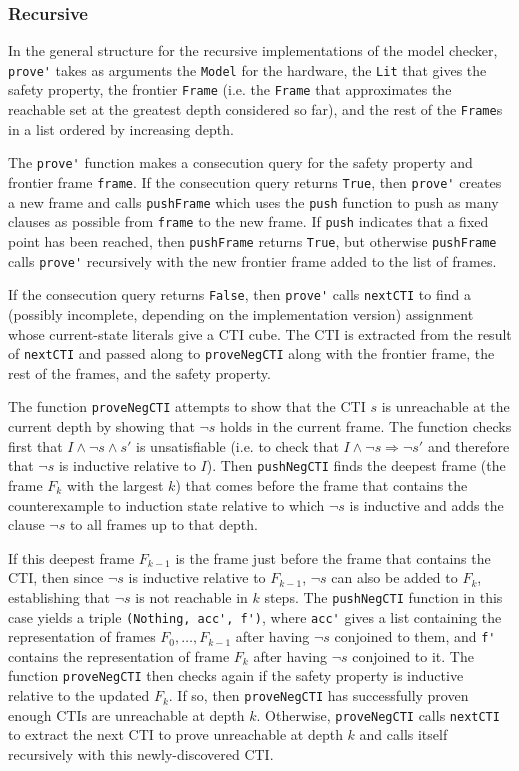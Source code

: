 \documentclass[12pt,a4paper,twoside,openright]{report}
\begin{document}
\subsubsection{Recursive}
In the general structure for the recursive implementations of the model checker,
\verb,prove', takes as arguments the \verb,Model, for the hardware, the
\verb,Lit, that gives the safety property, the frontier \verb,Frame, 
(i.e. the \verb,Frame, that approximates the reachable set at the greatest
depth considered so far), and the rest of the \verb,Frame,s in a list ordered by
increasing depth.

The \verb,prove', function makes a consecution query for the safety property and frontier
frame \verb,frame,. If the consecution query returns \verb,True,, then \verb,prove',
creates a new frame and calls \verb,pushFrame, which uses the \verb,push, function to
push as many clauses as possible from \verb,frame, to the new frame. If \verb,push,
indicates that a fixed point has been reached, then \verb,pushFrame, returns \verb,True,,
but otherwise \verb,pushFrame, calls \verb,prove', recursively with the new frontier
frame added to the list of frames.

If the consecution query returns \verb,False,, then \verb,prove', calls \verb,nextCTI,
to find a (possibly incomplete, depending on the implementation version)
assignment whose current-state literals give a CTI cube.
The CTI is extracted from the result of \verb,nextCTI, and passed along to \verb,proveNegCTI,
along with the frontier frame, the rest of the frames, and the safety property.

The function \verb,proveNegCTI, attempts to show that the CTI
$s$ is unreachable at the current depth by showing that $\neg s$ holds in the current frame.
The function checks first that $I \wedge \neg s \wedge s'$ is unsatisfiable
(i.e. to check that $I \wedge \neg s \Rightarrow \neg s'$ and therefore that $\neg s$ is
inductive relative to $I$). Then \verb,pushNegCTI, finds the deepest frame (the frame
$F_k$ with the largest $k$) that comes before the frame that contains the counterexample to
induction state relative to which $\neg s$ is inductive and adds the clause
$\neg s$ to all frames up to that depth.

If this deepest frame $F_{k - 1}$ is the frame just before the frame that contains the
CTI, then since $\neg s$ is inductive relative to $F_{k - 1}$, $\neg s$ can also be added
to $F_k$, establishing that $\neg s$ is not reachable in $k$ steps. The \verb,pushNegCTI,
function in this case yields a triple \verb:(Nothing, acc', f'):, where \verb,acc', gives
a list containing the representation of frames $F_0, \ldots, F_{k - 1}$ after having $\neg s$
conjoined to them, and \verb,f', contains the representation of frame $F_k$ after having
$\neg s$ conjoined to it. The function \verb,proveNegCTI, then checks again if the safety
property is inductive relative to the updated $F_k$. If so, then \verb,proveNegCTI, has
successfully proven enough CTIs are unreachable at depth $k$. Otherwise, \verb,proveNegCTI,
calls \verb,nextCTI, to extract the next CTI to prove unreachable at depth $k$ and calls
itself recursively with this newly-discovered CTI.
\end{document}
